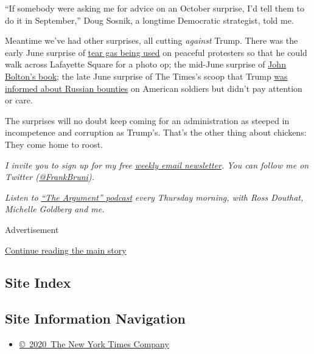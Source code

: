 ``If somebody were asking me for advice on an October surprise, I'd tell
them to do it in September,'' Doug Sosnik, a longtime Democratic
strategist, told me.

Meantime we've had other surprises, all cutting \emph{against} Trump.
There was the early June surprise of
\href{https://www.nytimes.com/2020/06/01/us/politics/trump-st-johns-church-bible.html}{tear
gas being used} on peaceful protesters so that he could walk across
Lafayette Square for a photo op; the mid-June surprise of
\href{https://www.nytimes.com/2020/06/17/books/review-room-where-it-happened-john-bolton-memoir.html}{John
Bolton's book}; the late June surprise of The Times's scoop that Trump
\href{https://www.nytimes.com/2020/06/29/us/politics/russian-bounty-trump.html}{was
informed about Russian bounties} on American soldiers but didn't pay
attention or care.

The surprises will no doubt keep coming for an administration as steeped
in incompetence and corruption as Trump's. That's the other thing about
chickens: They come home to roost.

\emph{I invite you to sign up for my free}
\href{https://www.nytimes.com/newsletters/frank-bruni}{\emph{weekly
email newsletter}}\emph{. You can follow me on Twitter
(}\href{https://twitter.com/FrankBruni}{\emph{@FrankBruni}}\emph{).}

\emph{Listen to}
\href{https://www.nytimes.com/column/the-argument}{\emph{``The
Argument'' podcast}} \emph{every Thursday morning, with Ross Douthat,
Michelle Goldberg and me.}

Advertisement

\protect\hyperlink{after-bottom}{Continue reading the main story}

\hypertarget{site-index}{%
\subsection{Site Index}\label{site-index}}

\hypertarget{site-information-navigation}{%
\subsection{Site Information
Navigation}\label{site-information-navigation}}

\begin{itemize}
\tightlist
\item
  \href{https://help.nytimes.com/hc/en-us/articles/115014792127-Copyright-notice}{©~2020~The
  New York Times Company}
\end{itemize}

